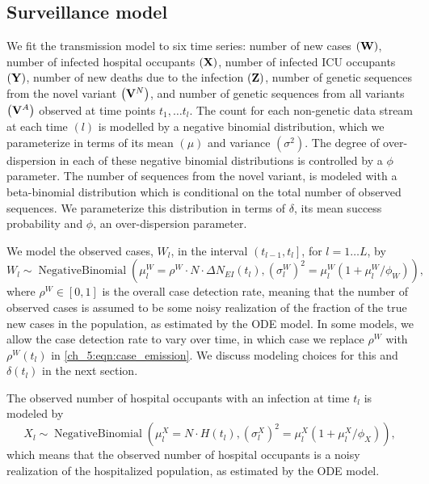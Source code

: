 \subsection{Surveillance model}
\label{ch_5:subsec:surveillance}

We fit the transmission model to six time series: number of new cases \( \left( \mathbf{W} \right) \),  number of infected hospital occupants \( \left( \mathbf{X} \right) \), number of infected ICU occupants \( \left( \mathbf{Y} \right) \), number of new deaths due to the infection \( \left( \mathbf{Z} \right) \), number of genetic sequences from the novel variant \( \left( \mathbf{V}^N \right) \), and number of genetic sequences from all variants \( \left( \mathbf{V}^A \right) \) observed at time points \( t_1, \ldots t_l \).
The count for each non-genetic data stream at each time \( \left( l \right) \) is modelled by a negative binomial distribution, which we parameterize in terms of its mean \( \left( \mu \right) \) and variance \( \left( \sigma^2 \right) \).
The degree of over-dispersion in each of these negative binomial distributions is controlled by a \( \phi \) parameter.
The number of sequences from the novel variant, is modeled with a beta-binomial distribution which is conditional on the total number of observed sequences.
We parameterize this distribution in terms of \( \delta \), its mean success probability and \( \phi \), an over-dispersion parameter.

We model the observed cases, \( W_l \), in the interval \( \left( t_{l - 1}, t_l \right] \), for \( l =1 \ldots L \), by
\begin{equation}
W_l \sim \operatorname{Negative Binomial} \left( \mu^{W}_l = \rho^W \cdot N \cdot \Delta N_{EI} \left( t_l \right), \left(\sigma^W_l\right)^{2} = \mu^{W}_l \left( 1 + \mu^{W}_l / \phi_W \right) \right),
\label{ch_5:eqn:case_emission}
\end{equation}
where \( \rho^W \in [0,1]\) is the overall case detection rate, meaning that the number of observed cases is assumed to be some noisy realization of the fraction of the true new cases in the population, as estimated by the ODE model.
In some models, we allow the case detection rate to vary over time, in which case we replace \( \rho^W \) with \( \rho^W \left( t_l \right) \) in \eqref{ch_5:eqn:case_emission}.
We discuss modeling choices for this and \( \delta \left( t_l \right) \) in the next section.

The observed number of hospital occupants with an infection at time \( t_l \) is modeled by
\begin{equation}
X_l \sim \operatorname{Negative Binomial} \left( \mu^{X}_l = N \cdot H \left( t_l \right), \left(\sigma^X_l\right)^{2} = \mu^{X}_l \left( 1 + \mu^{X}_l / \phi_X \right) \right),
\label{ch_5:eqn:hosp_emission}
\end{equation}
which means that the observed number of hospital occupants is a noisy realization of the hospitalized population, as estimated by the ODE model.

